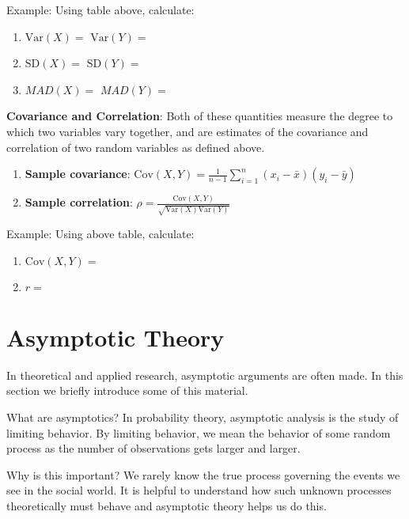 \documentclass[]{book}
\providecommand{\tightlist}{%
  \setlength{\itemsep}{0pt}\setlength{\parskip}{0pt}}
\newcommand{\Var}{\mathrm{Var}}
\newcommand{\SD}{\mathrm{SD}}
\newcommand{\Cov}{\mathrm{Cov}}
\theoremstyle{definition}
\theoremstyle{definition}
\theoremstyle{definition}
\theoremstyle{remark}
\begin{document}
\begin{framed}
Example: Using table above, calculate: 
\begin{enumerate}
\item $\Var(X) = $ \hspace{1.5cm} $\Var(Y) = $
\item $\SD(X) = $ \hspace{1.65cm} $\SD(Y) = $
\item $MAD(X) = $ \hspace{1.1cm} $MAD(Y) = $
\end{enumerate}
\end{framed}

\textbf{Covariance and Correlation}: Both of these quantities measure
the degree to which two variables vary together, and are estimates of
the covariance and correlation of two random variables as defined above.

\begin{enumerate}
\def\labelenumi{\arabic{enumi}.}
\tightlist
\item
  \textbf{Sample covariance}:
  \(\Cov(X,Y) = \frac{1}{n-1}\sum_{i = 1}^n(x_i - \bar{x})(y_i - \bar{y})\)
\item
  \textbf{Sample correlation}:
  \(\rho = \frac{\Cov(X,Y)}{\sqrt{\Var(X)\Var(Y)}}\)
\end{enumerate}

\begin{framed}
Example:  Using above table, calculate:
\begin{enumerate}
\item $\Cov(X,Y) = $
\item $r = $
\end{enumerate}
\end{framed}

\section{Asymptotic Theory}\label{asymptotic-theory}

In theoretical and applied research, asymptotic arguments are often
made. In this section we briefly introduce some of this material.

What are asymptotics? In probability theory, asymptotic analysis is the
study of limiting behavior. By limiting behavior, we mean the behavior
of some random process as the number of observations gets larger and
larger.

Why is this important? We rarely know the true process governing the
events we see in the social world. It is helpful to understand how such
unknown processes theoretically must behave and asymptotic theory helps
us do this.
\end{document}
